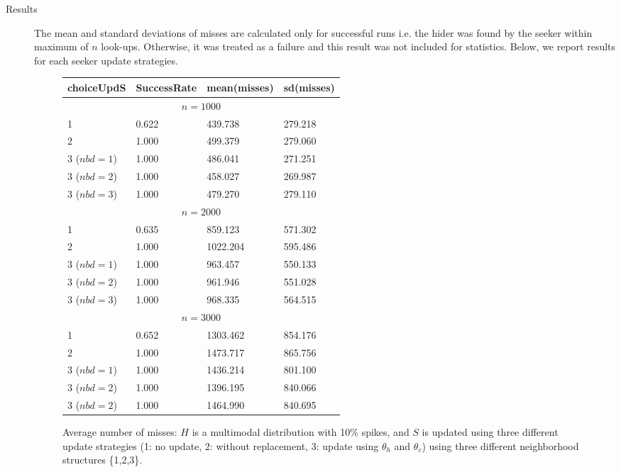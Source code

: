\documentclass[11pt,a4paper,draft]{article}
\begin{document}
\begin{description}
	\item[Results] The mean and standard deviations of misses are calculated only for successful runs i.e. the hider was found by the seeker within maximum of $n$ look-ups. Otherwise, it was treated as a failure and this result was not included for statistics. Below, we report results for each seeker update strategies.
	\begin{figure}[!h]
	\centering
	\begin{tabular}{llll}
		\hline \hline 
		choiceUpdS & SuccessRate & mean(misses) & sd(misses) \\
		\hline \hline 
		\multicolumn{4}{c}{$n = 1000$} \\ 
		\hline 
		1 &  0.622 & 439.738 & 279.218 \\
		2 &  1.000 & 499.379 & 279.060 \\
		3 ($nbd=1$) &  1.000 & 486.041 & 271.251 \\
		3 ($nbd=2$) &  1.000 & 458.027 & 269.987 \\
		3 ($nbd=3$) &  1.000 & 479.270 & 279.110 \\
		\hline 
		\hline 
		\multicolumn{4}{c}{$n = 2000$} \\ 
		\hline 
		1 &  0.635 & 859.123 & 571.302 \\
		2 &  1.000 & 1022.204 & 595.486 \\
		3 ($nbd=1$) &  1.000 & 963.457 & 550.133 \\
		3 ($nbd=2$) &  1.000 & 961.946 & 551.028 \\
		3 ($nbd=3$) &  1.000 & 968.335 & 564.515 \\
		\hline 
		\hline 
		\multicolumn{4}{c}{$n = 3000$} \\ 
		\hline 
		1 &  0.652 & 1303.462 & 854.176 \\
		2 &  1.000 & 1473.717 & 865.756 \\
		3 ($nbd=1$) &  1.000 & 1436.214 & 801.100 \\
		3 ($nbd=2$) &  1.000 & 1396.195 & 840.066 \\
		3 ($nbd=2$) &  1.000 & 1464.990 & 840.695 \\
		\hline 
		\hline 
	\end{tabular}
	\caption{Average number of misses: $H$ is a multimodal distribution with 10\% spikes, and $S$ is updated using three different update strategies (1: no update, 2: without replacement, 3: update using $\theta_h$ and $\theta_c$) using three different neighborhood structures \{1,2,3\}.}
	\end{figure}


\end{description}
\end{document}
